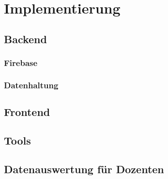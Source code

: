 \chapter{Implementierung}
\section{Backend}
\subsection{Firebase}
\subsection{Datenhaltung}
\section{Frontend}
\section{Tools}
\section{Datenauswertung für Dozenten}